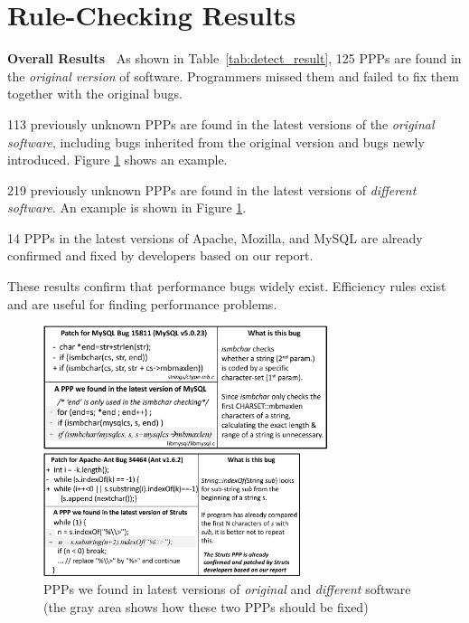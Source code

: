 \section{Rule-Checking Results}
\label{sec:detection_results}



{\bf Overall Results\ }
As shown in Table~\ref{tab:detect_result}, 125 PPPs are found in the {\it original 
version} of software.
Programmers missed them and failed to fix them together with the original bugs.

113 previously unknown PPPs are found in the latest versions of the 
{\it original software}, including bugs inherited from the original version
and bugs newly introduced. Figure \ref{fig:newbug} shows an example. 

219 previously unknown PPPs are found in the latest versions of
{\it different software}. An example is shown in Figure \ref{fig:newbug}. 

14 PPPs in the latest versions of Apache, Mozilla, and MySQL
are already confirmed and fixed by developers based on our report.

These results confirm that performance bugs widely 
exist. Efficiency rules exist and are useful for finding
performance problems.

\begin{figure}[t!]
\begin{center}
\begin{minipage}{3.3in}
\includegraphics[height=1.42in]{figures/mysql15811.eps}
\end{minipage}
\begin{minipage}{3in}
\includegraphics[height=1.42in]{figures/apache34464.eps}
\end{minipage}
\end{center}
\caption{PPPs we found in latest versions of {\it original} and {\it
different} software (the gray area shows how these two PPPs should be fixed)}
\label{fig:newbug}
\end{figure}

